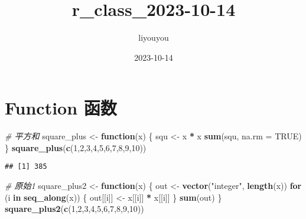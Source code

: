 \documentclass[
]{article}
\title{r\_class\_2023-10-14}
\author{liyouyou}
\date{2023-10-14}
\newenvironment{Shaded}{\begin{snugshade}}{\end{snugshade}}
\newcommand{\AttributeTok}[1]{\textcolor[rgb]{0.13,0.29,0.53}{#1}}
\newcommand{\CommentTok}[1]{\textcolor[rgb]{0.56,0.35,0.01}{\textit{#1}}}
\newcommand{\ConstantTok}[1]{\textcolor[rgb]{0.56,0.35,0.01}{#1}}
\newcommand{\ControlFlowTok}[1]{\textcolor[rgb]{0.13,0.29,0.53}{\textbf{#1}}}
\newcommand{\DecValTok}[1]{\textcolor[rgb]{0.00,0.00,0.81}{#1}}
\newcommand{\FunctionTok}[1]{\textcolor[rgb]{0.13,0.29,0.53}{\textbf{#1}}}
\newcommand{\NormalTok}[1]{#1}
\newcommand{\OtherTok}[1]{\textcolor[rgb]{0.56,0.35,0.01}{#1}}
\newcommand{\SpecialCharTok}[1]{\textcolor[rgb]{0.81,0.36,0.00}{\textbf{#1}}}
\newcommand{\StringTok}[1]{\textcolor[rgb]{0.31,0.60,0.02}{#1}}
\begin{document}
\maketitle

\hypertarget{function-ux51fdux6570}{%
\section{Function 函数}\label{function-ux51fdux6570}}

\begin{Shaded}
\begin{Highlighting}[]
\CommentTok{\# 平方和}
\NormalTok{square\_plus }\OtherTok{\textless{}{-}} \ControlFlowTok{function}\NormalTok{(x) \{}
\NormalTok{  squ }\OtherTok{\textless{}{-}}\NormalTok{ x }\SpecialCharTok{*}\NormalTok{ x}
  \FunctionTok{sum}\NormalTok{(squ, }\AttributeTok{na.rm =} \ConstantTok{TRUE}\NormalTok{)}
\NormalTok{\}}
\FunctionTok{square\_plus}\NormalTok{(}\FunctionTok{c}\NormalTok{(}\DecValTok{1}\NormalTok{,}\DecValTok{2}\NormalTok{,}\DecValTok{3}\NormalTok{,}\DecValTok{4}\NormalTok{,}\DecValTok{5}\NormalTok{,}\DecValTok{6}\NormalTok{,}\DecValTok{7}\NormalTok{,}\DecValTok{8}\NormalTok{,}\DecValTok{9}\NormalTok{,}\DecValTok{10}\NormalTok{))}
\end{Highlighting}
\end{Shaded}

\begin{verbatim}
## [1] 385
\end{verbatim}

\begin{Shaded}
\begin{Highlighting}[]
\CommentTok{\# 原始1}
\NormalTok{square\_plus2 }\OtherTok{\textless{}{-}} \ControlFlowTok{function}\NormalTok{(x) \{}
\NormalTok{  out }\OtherTok{\textless{}{-}} \FunctionTok{vector}\NormalTok{(}\StringTok{"integer"}\NormalTok{, }\FunctionTok{length}\NormalTok{(x))}
  \ControlFlowTok{for}\NormalTok{ (i }\ControlFlowTok{in} \FunctionTok{seq\_along}\NormalTok{(x)) \{}
\NormalTok{    out[[i]] }\OtherTok{\textless{}{-}}\NormalTok{ x[[i]] }\SpecialCharTok{*}\NormalTok{ x[[i]]}
\NormalTok{  \}}
  \FunctionTok{sum}\NormalTok{(out)}
\NormalTok{\}}
\FunctionTok{square\_plus2}\NormalTok{(}\FunctionTok{c}\NormalTok{(}\DecValTok{1}\NormalTok{,}\DecValTok{2}\NormalTok{,}\DecValTok{3}\NormalTok{,}\DecValTok{4}\NormalTok{,}\DecValTok{5}\NormalTok{,}\DecValTok{6}\NormalTok{,}\DecValTok{7}\NormalTok{,}\DecValTok{8}\NormalTok{,}\DecValTok{9}\NormalTok{,}\DecValTok{10}\NormalTok{))}
\end{Highlighting}
\end{Shaded}
\end{document}

